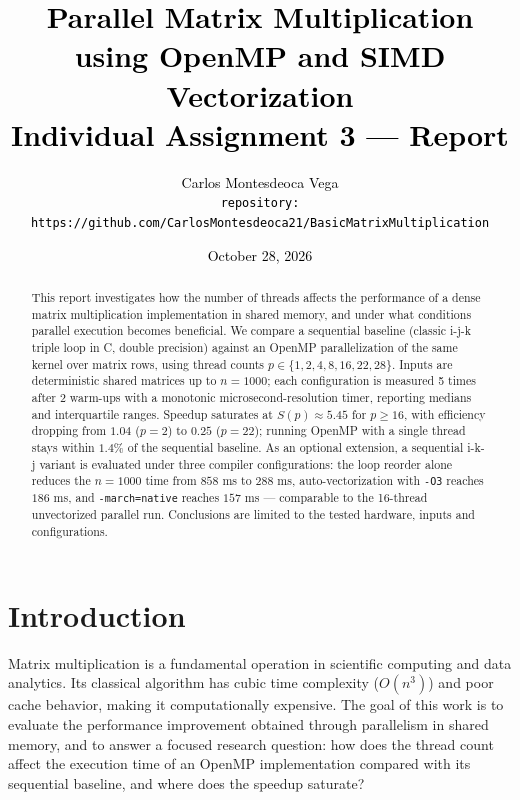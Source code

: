 \documentclass[12pt,a4paper]{article}
\begin{document}
\title{\textcolor{black}{\LARGE\bfseries Parallel Matrix Multiplication
using OpenMP and SIMD Vectorization\\[0.5em]
\normalsize\normalfont Individual Assignment 3 --- Report}}
\author{\textcolor{black}{Carlos Montesdeoca Vega\\[8pt]
\texttt{repository:}\\[2pt]
\small\texttt{https://github.com/CarlosMontesdeoca21/BasicMatrixMultiplication}}}
\date{\textcolor{black}{October 28, 2026}}

\maketitle

\begin{abstract}
This report investigates how the number of threads affects the performance of
a dense matrix multiplication implementation in shared memory, and under what
conditions parallel execution becomes beneficial. We compare a sequential
baseline (classic i-j-k triple loop in C, double precision) against an OpenMP
parallelization of the same kernel over matrix rows, using thread counts
$p \in \{1, 2, 4, 8, 16, 22, 28\}$. Inputs are deterministic shared matrices
up to $n = 1000$;
each configuration is measured 5 times after 2 warm-ups with a
monotonic microsecond-resolution timer, reporting medians and interquartile
ranges. Speedup saturates at $S(p) \approx 5.45$ for $p \geq 16$, with
efficiency dropping from $1.04$ ($p=2$) to $0.25$ ($p=22$); running OpenMP
with a single thread stays within $1.4\%$ of the sequential baseline. As an
optional extension, a sequential i-k-j variant is evaluated under three
compiler configurations: the loop reorder alone reduces the $n=1000$ time
from $858$ ms to $288$ ms, auto-vectorization with \texttt{-O3} reaches
$186$ ms, and \texttt{-march=native} reaches $157$ ms --- comparable to the
16-thread unvectorized parallel run. Conclusions are limited to the tested
hardware, inputs and configurations.
\end{abstract}

\section{Introduction}
\label{sec:intro}

Matrix multiplication is a fundamental operation in scientific computing and
data analytics. Its classical algorithm has cubic time complexity
($O(n^3)$) and poor cache behavior, making it computationally expensive.
The goal of this work is to evaluate the performance improvement obtained
through parallelism in shared memory, and to answer a focused research
question: how does the thread count affect the execution time of an OpenMP
implementation compared with its sequential baseline, and where does the
speedup saturate?
\end{document}
